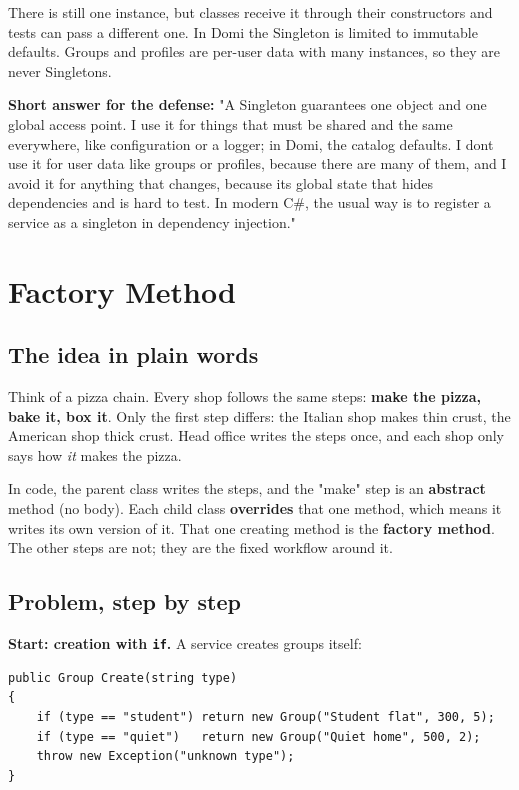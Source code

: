 \documentclass{utmreport}
\providecommand{\passthrough}[1]{#1}
\begin{document}
There is still one instance, but classes receive it through their constructors and tests can pass a different one. In Domi the Singleton is limited to immutable defaults. Groups and profiles are per-user data with many instances, so they are never Singletons.

\textbf{Short answer for the defense:} "A Singleton guarantees one object and one global access point. I use it for things that must be shared and the same everywhere, like configuration or a logger; in Domi, the catalog defaults. I don\textquotesingle t use it for user data like groups or profiles, because there are many of them, and I avoid it for anything that changes, because it\textquotesingle s global state that hides dependencies and is hard to test. In modern C\#, the usual way is to register a service as a singleton in dependency injection."

\chapter{Factory Method}

\section{The idea in plain words}

Think of a pizza chain. Every shop follows the same steps: \textbf{make the pizza, bake it, box it}. Only the first step differs: the Italian shop makes thin crust, the American shop thick crust. Head office writes the steps once, and each shop only says how \emph{it} makes the pizza.

In code, the parent class writes the steps, and the "make" step is an \textbf{abstract} method (no body). Each child class \textbf{overrides} that one method, which means it writes its own version of it. That one creating method is the \textbf{factory method}. The other steps are not; they are the fixed workflow around it.

\section{Problem, step by step}

\textbf{Start: creation with \passthrough{\lstinline!if!}.} A service creates groups itself:

\begin{lstlisting}
public Group Create(string type)
{
    if (type == "student") return new Group("Student flat", 300, 5);
    if (type == "quiet")   return new Group("Quiet home", 500, 2);
    throw new Exception("unknown type");
}
\end{lstlisting}
\end{document}
